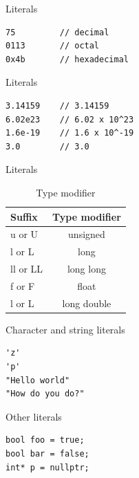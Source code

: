 \documentclass{beamer}
\begin{document}
\begin{frame}[fragile]{Literals}

\begin{lstlisting}[caption=Integer Numerals]
75         // decimal
0113       // octal
0x4b       // hexadecimal
\end{lstlisting}

\end{frame}

\begin{frame}[fragile]{Literals}

\begin{lstlisting}[caption=Floating Point Numerals]
3.14159    // 3.14159
6.02e23    // 6.02 x 10^23
1.6e-19    // 1.6 x 10^-19
3.0        // 3.0
\end{lstlisting}

\end{frame}

\begin{frame}{Literals}
\begin{table}
\begin{tabular}{l | c}
Suffix & Type modifier \\
\hline
u or U & unsigned \\
l or L & long \\
ll or LL & long long \\
f or F & float \\
l or L & long double
\end{tabular}
\caption{Type modifier}
\end{table}

\end{frame}

\begin{frame}[fragile]{Character and string literals}

\begin{lstlisting}[caption=Character and string literals]
'z'
'p'
"Hello world"
"How do you do?"
\end{lstlisting}

\end{frame}

\begin{frame}[fragile]{Other literals}
\begin{lstlisting}[caption=Other literals]
bool foo = true;
bool bar = false;
int* p = nullptr;
\end{lstlisting}
\end{frame}
\end{document}
